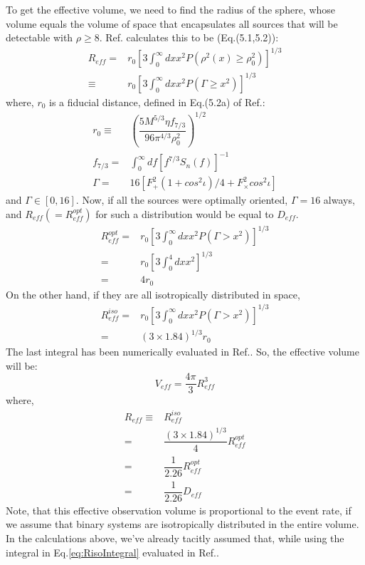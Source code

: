 \documentclass[aps,
prd,
amsmath,
amssymb,
twocolumn,
floatfix,
groupedaddress]{revtex4-1}
\def\l({\left(}
\def\r){\right)}
\begin{document}
To get the effective volume, we need to find the radius of the sphere, whose volume equals the volume of space that encapsulates all sources that will be detectable with $\rho \geq 8$. Ref.\citep{FinnChernoffDA} calculates this to be (Eq.(5.1,5.2)):
\begin{align}\nonumber
R_{eff} = & r_0 \left[3\int_0^{\infty} dx x^2 P(\rho^2(x)\geq\rho_0^2) \right]^{1/3}\\
\equiv & r_0 \left[3\int_0^{\infty} dx x^2 P(\Gamma\geq x^2) \right]^{1/3}
\end{align}
where, $r_0$ is a fiducial distance, defined in Eq.(5.2a) of Ref.\citep{FinnChernoffDA}:
\begin{align}\nonumber
r_0 \equiv & \l(\dfrac{5M^{5/3}\eta f_{7/3}}{96\pi^{4/3}\rho_0^2} \r)^{1/2}\\
f_{7/3} = &  \int_0^{\infty} df \left[f^{7/3} S_n(f) \right]^{-1}\\
\Gamma = & 16\left[F^2_+\l(1+cos^2\iota\r)/4 + F^2_{\times}cos^2\iota \right]
\end{align}
and $\Gamma\in [0,16]$. Now, if all the sources were optimally oriented, $\Gamma = 16$ always, and $R_{eff}(=R_{eff}^{opt})$ for such a distribution would be equal to $D_{eff}$.
\begin{align}\nonumber
R^{opt}_{eff} = & r_0 \left[3\int_0^{\infty} dx x^2 P(\Gamma > x^2) \right]^{1/3}\\ \nonumber
= & r_0 \left[3\int_0^{4} dx x^2 \right]^{1/3}\\ 
= & 4 r_0
\end{align}
On the other hand, if they are all isotropically distributed in space, 
\begin{align}\nonumber\label{eq:RisoIntegral}
R^{iso}_{eff} = & r_0 \left[3\int_0^{\infty} dx x^2 P(\Gamma > x^2) \right]^{1/3}\\
= & (3\times 1.84)^{1/3} r_0
\end{align}
The last integral has been numerically evaluated in Ref.\citep{FinnChernoffDA}. So, the effective volume will be:
\begin{equation}\label{eq:Veff}
V_{eff} = \dfrac{4\pi}{3} R^3_{eff}
\end{equation}
where, 
\begin{align}\nonumber
R_{eff} \equiv & R^{iso}_{eff}\\ \nonumber
= & \dfrac{(3\times 1.84)^{1/3}}{4} R^{opt}_{eff}\\
= & \dfrac{1}{2.26} R^{opt}_{eff}\\ \nonumber
= & \dfrac{1}{2.26} D_{eff}
\end{align}
Note, that this effective observation volume is proportional to the event rate, if we assume that binary systems are isotropically distributed in the entire volume. In the calculations above, we've already tacitly assumed that, while using the integral in Eq.\eqref{eq:RisoIntegral} evaluated in Ref.\citep{FinnChernoffDA}.
\end{document}
